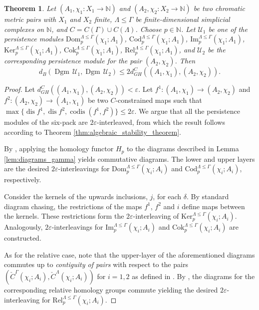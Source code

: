\documentclass[8pt,a4paper,oneside,english,english]{article}
\theoremstyle{plain}
\theoremstyle
{plain}
\newtheorem{theorem}{Theorem}[section]
\theoremstyle{definition}
\newcommand{\N}{\mathbb{N}}
\newcommand{\GH}{d_{GH}}
\newcommand{\MP}[1]{(A_{#1},\chi_{#1})}
\newcommand{\extMP}[1]{(A_{#1},\chi_{#1}\colon X_{#1}\to\N)}
\newcommand{\sixPackPersistenceModule}[6]{{#6}_{#5}^{{#3}\leq{#4}}({#2};{#1})}
\newcommand{\Dom}[5]{\sixPackPersistenceModule{#1}{#2}{#3}{#4}{#5}{\mathrm{Dom}}}
\newcommand{\Cod}[5]{\sixPackPersistenceModule{#1}{#2}{#3}{#4}{#5}{\mathrm{Cod}}}
\newcommand{\Img}[5]{\sixPackPersistenceModule{#1}{#2}{#3}{#4}{#5}{\mathrm{Im}}}
\newcommand{\Ker}[5]{\sixPackPersistenceModule{#1}{#2}{#3}{#4}{#5}{\mathrm{Ker}}}
\newcommand{\Cok}[5]{\sixPackPersistenceModule{#1}{#2}{#3}{#4}{#5}{\mathrm{Cok}}}
\newcommand{\Rel}[5]{\sixPackPersistenceModule{#1}{#2}{#3}{#4}{#5}{\mathrm{Rel}}}
\DeclareMathOperator{\dis}{dis}
\DeclareMathOperator{\codis}{codis}
\DeclareMathOperator{\Dgm}{Dgm}
\begin{document}
\begin{theorem}\label{thm:stability_6_pack}
	Let $\extMP{1}$ and $\extMP{2}$ be two chromatic metric pairs with $X_1$ and $X_2$ finite, $\Lambda\leq \Gamma$ be finite-dimensional simplicial complexes on $\N$, and $C=C(\Gamma)\cup C(\Lambda)$. Choose $p\in\N$. Let $\mathcal{U}_1$ be one of the persistence modules
    $\Dom{A_1}{\chi_1}{\Lambda}{\Gamma}{p}$,
    $\Cod{A_1}{\chi_1}{\Lambda}{\Gamma}{p}$,
    $\Img{A_1}{\chi_1}{\Lambda}{\Gamma}{p}$,
    $\Ker{A_1}{\chi_1}{\Lambda}{\Gamma}{p}$,
    $\Cok{A_1}{\chi_1}{\Lambda}{\Gamma}{p}$,
    $\Rel{A_1}{\chi_1}{\Lambda}{\Gamma}{p}$,
    and $\mathcal{U}_2$ be the corresponding persistence module for the pair $(A_2, \chi_2)$. Then
	\[
	d_B(\Dgm\,\mathcal{U}_1,\Dgm\,\mathcal{U}_2)\leq 2\GH^{C}(\MP{1},\MP{2}).
	\]

    
\end{theorem}


\begin{proof}
    Let $d_{GH}^C(\MP{1},\MP{2})<\varepsilon$. Let $f^1\colon\MP{1}\to\MP{2}$ and $f^2\colon\MP{2}\to\MP{1}$ be two $C$-constrained maps such that $\max\{\dis f^1,\dis f^2,\codis(f^1,f^2)\}\leq 2\varepsilon$.
    We argue that all the persistence modules of the six-pack are $2\varepsilon$-interleaved, from which the result follows according to Theorem \ref{thm:algebraic_stability_theorem}. 

    By \cite[Theorem 12.5]{Mun}, applying the homology functor $H_p$ to the diagrams described in Lemma \ref{lem:diagrams_gamma} yields commutative diagrams. The lower and upper layers are the desired $2\varepsilon$-interleavings for $\Dom{A_i}{\chi_i}{\Lambda}{\Gamma}{p}$ and $\Cod{A_i}{\chi_i}{\Lambda}{\Gamma}{p}$, respectively.

    Consider the kernels of the upwards inclusions, $j$, for each $\delta$. By standard diagram chasing, the restrictions of the maps $f^1$, $f^2$ and $i$ define maps between the kernels. These restrictions form the $2\varepsilon$-interleaving of $\Ker{A_i}{\chi_i}{\Lambda}{\Gamma}{p}$. Analogously, $2\varepsilon$-interleavings for $\Img{A_i}{\chi_i}{\Lambda}{\Gamma}{p}$ and $\Cok{A_i}{\chi_i}{\Lambda}{\Gamma}{p}$ are constructed.

    As for the relative case, note that the upper-layer of the aforementioned diagrams commutes up to {\em contiguity of pairs} with respect to the pairs $(\check{C}^\Gamma(\chi_i;A_i), \check{C}^\Lambda(\chi_i;A_i))$ for $i=1,2$ as defined in \cite{Mun}. By \cite[Theorem 12.6]{Mun}, the diagrams for the corresponding relative homology groups commute yielding the desired $2\varepsilon$-interleaving for $\Rel{A_i}{\chi_i}{\Lambda}{\Gamma}{p}$.
\end{proof}
\end{document}
